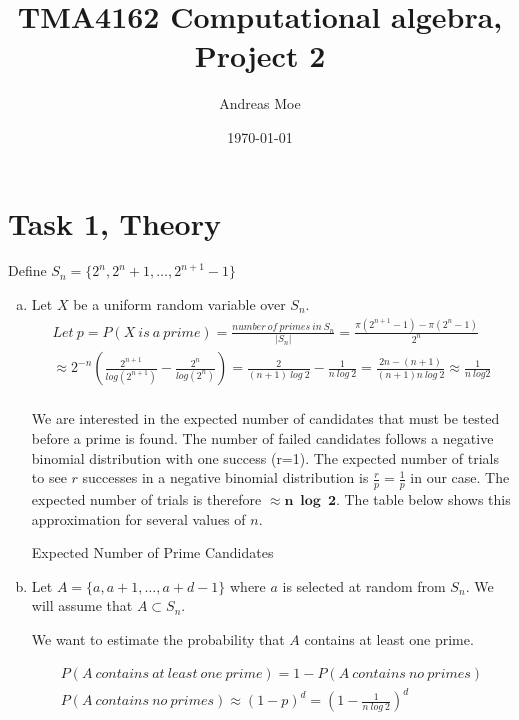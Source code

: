 \documentclass[12pt,a4paper]{article}
\title{TMA4162 Computational algebra, Project 2}
\author{Andreas Moe}
\date{\today}
\begin{document}
\maketitle

\section*{Task 1, Theory}
Define \(S_n = \{2^n, 2^n+1, \dots , 2^{n+1}-1\}\)
\begin{enumerate}[a)]
    \item
    Let \(X\) be a uniform random variable over \(S_n\).
    \begin{gather*}
        Let\ p = P(X\ is\ a\ prime) = \frac{number\ of\ primes\ in\ S_n}{|S_n|}
        = \frac{\pi(2^{n+1}-1) - \pi(2^n-1)}{2^n}\\
        \approx 2^{-n}\left(\frac{2^{n+1}}{log(2^{n+1})}-\frac{2^n}{log(2^n)}\right)
        = \frac{2}{(n+1)\ log\ 2}-\frac{1}{n\ log\ 2}
        = \frac{2n - (n+1)}{(n+1)n\ log\ 2}
        \approx \frac{1}{n\ log 2}\\
    \end{gather*}

    \vspace{20pt}
    We are interested in the expected number of candidates that must be tested before a prime is found. The number of failed candidates follows a negative binomial distribution with one success (r=1). The expected number of trials to see \(r\) successes in a negative binomial distribution is \(\frac{r}{p} = \frac{1}{p}\) in our case.
    The expected number of trials is therefore \(\approx \mathbf{n\ \log\ 2}\).
    The table below shows this approximation for several values of \(n\).
        {\begin{table}[H]
             \centering
             \caption{Expected Number of Prime Candidates}
             \label{tab:exp_prime_candidates}
             
        \end{table}}

    \item
    Let \(A = \{a, a+1, \dots , a + d - 1\}\) where \(a\) is selected at random from \(S_n\).
    We will assume that \(A \subset S_n\).

    We want to estimate the probability that \(A\) contains at least one prime.

    \begin{gather*}
        P(A\ contains\ at\ least\ one\ prime) = 1 - P(A\ contains\ no\ primes)\\
        P(A\ contains\ no\ primes) \approx (1-p)^d = \left(1-\frac{1}{n\ log\ 2}\right)^d
    \end{gather*}


\end{enumerate}
\end{document}
